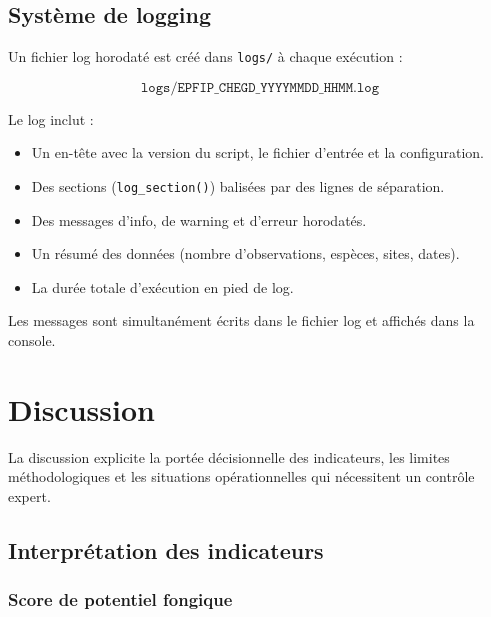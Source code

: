 \documentclass[11pt,a4paper]{article}
\begin{document}
\subsection{Système de logging}

Un fichier log horodaté est créé dans \texttt{logs/} à chaque exécution :

\[
  \texttt{logs/EPFIP\_CHEGD\_YYYYMMDD\_HHMM.log}
\]

Le log inclut :
\begin{itemize}
  \item Un en-tête avec la version du script, le fichier d'entrée et la configuration.
  \item Des sections (\texttt{log\_section()}) balisées par des lignes de séparation.
  \item Des messages d'info, de warning et d'erreur horodatés.
  \item Un résumé des données (nombre d'observations, espèces, sites, dates).
  \item La durée totale d'exécution en pied de log.
\end{itemize}

Les messages sont simultanément écrits dans le fichier log et affichés dans la console.

\section{Discussion}

La discussion explicite la portée décisionnelle des indicateurs, les limites méthodologiques
et les situations opérationnelles qui nécessitent un contrôle expert.

\subsection{Interprétation des indicateurs}

\subsubsection{Score de potentiel fongique}
\end{document}
